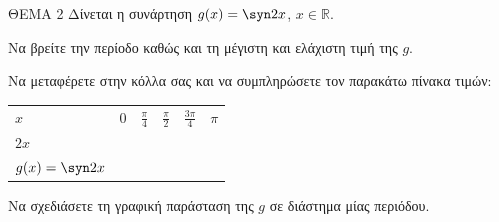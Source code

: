 ΘEMA 2
Δίνεται η συνάρτηση $g(x) = \syn  2x$, $x \in \mathbb{R}$.
\begin{alist}
\item Να βρείτε την περίοδο καθώς και τη μέγιστη και ελάχιστη τιμή της $g$.
\item
\begin{rlist}
\item Να μεταφέρετε στην κόλλα σας και να συμπληρώσετε τον παρακάτω πίνακα τιμών:
\begin{longtable}[]{@{}
  >{\centering\arraybackslash}p{}
  >{\centering\arraybackslash}p{}
  >{\centering\arraybackslash}p{}
  >{\centering\arraybackslash}p{}
  >{\centering\arraybackslash}p{}
  >{\centering\arraybackslash}p{}@{}}
\noalign{}
\begin{minipage}[b]{\linewidth}\centering
$x$
\end{minipage} & \begin{minipage}[b]{\linewidth}\centering
$0$
\end{minipage} & \begin{minipage}[b]{\linewidth}\centering
$\frac{\pi}{4}$
\end{minipage} & \begin{minipage}[b]{\linewidth}\centering
$\frac{\pi}{2}$
\end{minipage} & \begin{minipage}[b]{\linewidth}\centering
$\frac{3\pi}{4}$
\end{minipage} & \begin{minipage}[b]{\linewidth}\centering
$\pi$
\end{minipage} \\
\noalign{}
\noalign{}
\endlastfoot
$2x$ & & & & & \\
$g(x) = \syn  2x$ & & & & & \\
\end{longtable}
\item Να σχεδιάσετε τη γραφική παράσταση της $g$ σε διάστημα μίας περιόδου.
\end{rlist}
\end{alist}

